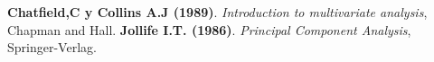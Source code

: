 
\begin{thebibliography}{99}
	

         \textbf{Chatfield,C y Collins A.J (1989)}. {\em Introduction to multivariate analysis}, Chapman and Hall.
         \textbf{Jollife I.T.
            (1986)}. 
            {\em Principal Component Analysis}, Springer-Verlag.
        
\end{thebibliography}
